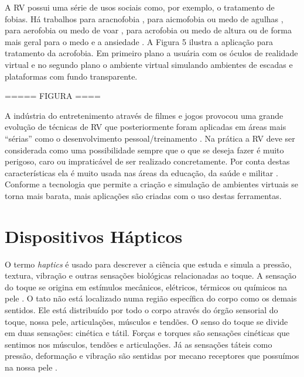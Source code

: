 A RV possui uma série de usos sociais como, por exemplo, o tratamento de fobias. Há trabalhos para aracnofobia \cite{Carlin1997}, para aicmofobia ou medo de agulhas \cite{Galoustian2018}, para aerofobia ou medo de voar \cite{Rothbaum2006}, para acrofobia ou medo de altura \cite{Edwards2018} ou de forma mais geral para o medo e a ansiedade \cite{Goldman2017}. A Figura 5 ilustra a aplicação para tratamento da acrofobia. Em primeiro plano a usuária com os óculos de realidade virtual e no segundo plano o ambiente virtual simulando ambientes de escadas e plataformas com fundo transparente.

===== FIGURA ====

A indústria do entretenimento através de filmes e jogos provocou uma grande evolução de técnicas de RV que posteriormente foram aplicadas em áreas mais “sérias” como o desenvolvimento pessoal/treinamento \cite{Ma2011, Prensky2001, Smith2011}. Na prática a RV deve ser considerada como uma possibilidade sempre que o que se deseja fazer é muito perigoso, caro ou impraticável de ser realizado concretamente. Por conta destas características ela é muito usada nas áreas da educação, da saúde e militar \cite{VRS2018}. Conforme a tecnologia que permite a criação e simulação de ambientes virtuais se torna mais barata, mais aplicações são criadas com o uso destas ferramentas.

\section{Dispositivos Hápticos}

O termo \textit{haptics} é usado para descrever a ciência que estuda e simula a pressão, textura, vibração e outras sensações biológicas relacionadas ao toque. A sensação do toque se origina em estímulos mecânicos, elétricos, térmicos ou químicos na pele \cite{Burdea1996}. O tato não está localizado numa região específica do corpo como os demais sentidos. Ele está distribuído por todo o corpo através do órgão sensorial do toque, nossa pele, articulações, músculos e tendões. O senso do toque se divide em duas sensações: cinética e tátil. Forças e torques são sensações cinéticas que sentimos nos músculos, tendões e articulações. Já as sensações táteis como pressão, deformação e vibração são sentidas por mecano receptores que possuímos na nossa pele \cite{Culbertson2018}. 

